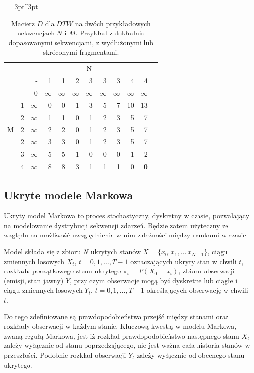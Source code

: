 \begin{table}[H]
    \caption{Macierz $D$ dla $DTW$ na dwóch przykładowych sekwencjach $N$ i $M$. Przykład z dokładnie dopasowanymi sekwencjami, z wydłużonymi lub skróconymi fragmentami.}
    \centering
    \label{tab:dtw_example1}
    \small
    \tabulinesep =_3pt^3pt
    \begin{tabu}{r*{11}{r}}
         & & 
        \\
        & & - & 1 & 1 & 2 & 3 & 3 & 3 & 4 & 4
        \\ \midrule
         & - & 0 & $\infty$ & $\infty$ & $\infty$ & $\infty$ & $\infty$ & $\infty$ & $\infty$ & $\infty$
        \\
        & 1 & $\infty$ & 0 & 0 & 1 & 3 & 5 & 7 & 10 & 13
        \\
        & 2 & $\infty$ & 1 & 1 & 0 & 1 & 2 & 3 & 5 & 7
        \\
        & 2 & $\infty$ & 2 & 2 & 0 & 1 & 2 & 3 & 5 & 7
        \\
        & 2 & $\infty$ & 3 & 3 & 0 & 1 & 2 & 3 & 5 & 7
        \\
        & 3 & $\infty$ & 5 & 5 & 1 & 0 & 0 & 0 & 1 & 2
        \\
        & 4 & $\infty$ & 8 & 8 & 3 & 1 & 1 & 1 & 0 & \textbf{0}
        \\
    \end{tabu}
\end{table}

\subsection{Ukryte modele Markowa}\label{sec:hmm}

Ukryty model Markowa to proces stochastyczny, dyskretny w czasie, pozwalający na modelowanie dystrybucji
sekwencji zdarzeń. Będzie zatem użyteczny ze względu na możliwość uwzględnienia w nim zależności
między ramkami w czasie.

Model składa się z zbioru $N$ ukrytych stanów $X = \{x_0, x_1, \dots\, x_{N-1}\}$, ciągu zmiennych losowych
$X_t$, $t = 0, 1, \dots, T - 1$ oznaczających ukryty stan w chwili $t$, rozkładu początkowego stanu ukrytego
$\pi_i = P(X_0 = x_i)$, zbioru obserwacji (emisji, stan jawny) $Y$, przy czym obserwacje mogą być dyskretne
lub ciągłe i ciągu zmiennych losowych $Y_t$, $t = 0, 1, \dots, T - 1$ określających obserwację w chwili $t$.

Do tego zdefiniowane są prawdopodobieństwa przejść między stanami oraz rozkłady obserwacji w każdym stanie.
Kluczową kwestią w modelu Markowa, zwaną regułą Markowa, jest iż rozkład prawdopodobieństwo następnego stanu $X_t$
zależy wyłącznie od stanu poprzedzającego, nie jest ważna cała historia stanów w przeszłości. Podobnie rozkład
obserwacji $Y_t$ zależy wyłącznie od obecnego stanu ukrytego.

